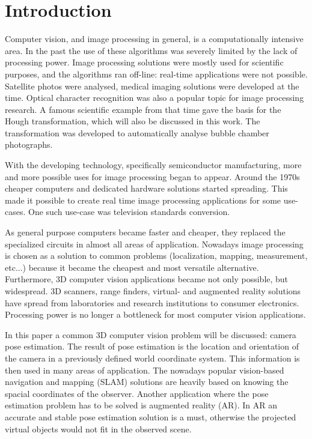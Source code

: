 \chapter*{Introduction}

Computer vision, and image processing in general, is a computationally intensive area.
In the past the use of these algorithms was severely limited by the lack of processing power.
Image processing solutions were mostly used for scientific purposes, and the algorithms ran off-line: real-time applications were not possible.
Satellite photos were analysed, medical imaging solutions were developed at the time.
Optical character recognition was also a popular topic for image processing research.
A famous scientific example from that time gave the basis for the Hough transformation, which will also be discussed in this work.
The transformation was developed to automatically analyse bubble chamber photographs.

With the developing technology, specifically semiconductor manufacturing, more and more possible uses for image processing began to appear.
Around the 1970s cheaper computers and dedicated hardware solutions started spreading.
This made it possible to create real time image processing applications for some use-cases.
One such use-case was television standards conversion.

As general purpose computers became faster and cheaper, they replaced the specialized circuits in almost all areas of application.
Nowadays image processing is chosen as a solution to common problems (localization, mapping, measurement, etc...) because it became the cheapest and most versatile alternative.
Furthermore, 3D computer vision applications became not only possible, but widespread.
3D scanners, range finders, virtual- and augmented reality solutions have spread from laboratories and research institutions to consumer electronics.
Processing power is no longer a bottleneck for most computer vision applications.

In this paper a common 3D computer vision problem will be discussed: camera pose estimation.
The result of pose estimation is the location and orientation of the camera in a previously defined world coordinate system.
This information is then used in many areas of application.
The nowadays popular vision-based navigation and mapping (SLAM) solutions are heavily based on knowing the spacial coordinates of the observer.
Another application where the pose estimation problem has to be solved is augmented reality (AR).
In AR an accurate and stable pose estimation solution is a must, otherwise the projected virtual objects would not fit in the observed scene.

